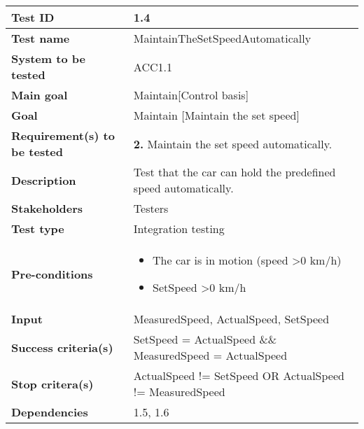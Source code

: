 	\begin{table}[H]
		\begin{tabular}{| p{4cm} | p{10cm} |}
		\hline
		\rowcolor{gray}
			\hline
			{\bf Test ID} & 1.4 \\ \hline
			{\bf Test name} & MaintainTheSetSpeedAutomatically\\ \hline
			{\bf System to be tested} & ACC1.1\\ \hline
			{\bf Main goal} & Maintain[Control basis] \\ \hline
			{\bf Goal} & Maintain [Maintain the set speed]\\ \hline
			{\bf Requirement(s) to be tested} & {\bf 2.} Maintain the set speed automatically.\\ \hline
			{\bf Description} & Test that the car can hold the predefined speed 
			automatically. \\ \hline
			{\bf Stakeholders} & Testers \\ \hline
			{\bf Test type} &  Integration testing\\ \hline
			{\bf Pre-conditions} & 
				\begin{itemize}
					\item The car is in motion (speed \textgreater  0 km/h)
					\item SetSpeed \textgreater 0 km/h
				\end{itemize}\\ \hline
			{\bf Input} & MeasuredSpeed, ActualSpeed, SetSpeed\\ \hline
			{\bf Success criteria(s)}& SetSpeed = ActualSpeed \&\& 
			MeasuredSpeed = ActualSpeed\\ \hline
			{\bf Stop critera(s)} &  ActualSpeed != SetSpeed OR
			ActualSpeed != MeasuredSpeed\\ \hline
			{\bf Dependencies} & 1.5, 1.6 \\ \hline
		\end{tabular}
	\end{table}


